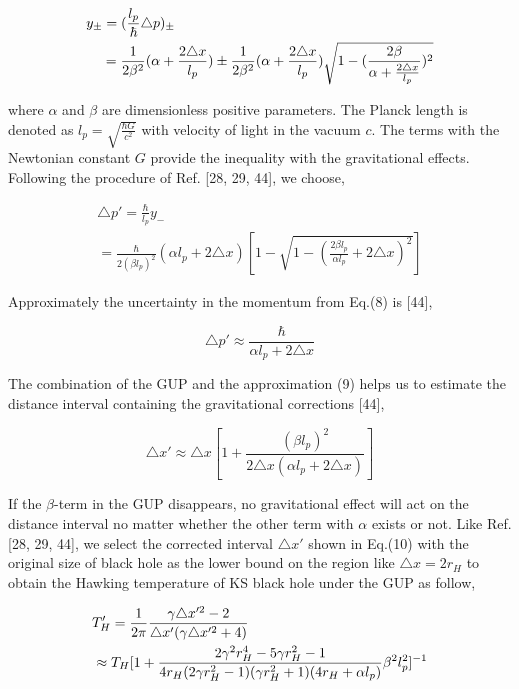 \documentclass[graphicx, 12pt]{article}
\begin{document}
\begin{eqnarray}
y_{\pm}=(\frac{l_{p}}{\hbar}\triangle
p)_{\pm}\hspace{6.5cm}\nonumber\\
=\frac{1}{2\beta^{2}}(\alpha+\frac{2\triangle
x}{l_{p}})\pm\frac{1}{2\beta^{2}}(\alpha+\frac{2\triangle
x}{l_{p}})\sqrt{1-(\frac{2\beta}{\alpha+\frac{2\triangle
x}{l_{p}}})^{2}}
\end{eqnarray}

\noindent where $\alpha$ and $\beta$ are dimensionless positive
parameters. The Planck length is denoted as
$l_{p}=\sqrt{\frac{\hbar G}{c^{2}}}$ with velocity of light in the
vacuum $c$. The terms with the Newtonian constant $G$ provide the
inequality with the gravitational effects. Following the procedure
of Ref. [28, 29, 44], we choose,

\begin{eqnarray}
\triangle p'=\frac{\hbar}{l_{p}}y_{-}\hspace{6cm}\nonumber\\
=\frac{\hbar}{2(\beta l_{p})^{2}}(\alpha l_{p}+2\triangle
x)[1-\sqrt{1-(\frac{2\beta l_{p}}{\alpha l_{p}}+2\triangle
x)^{2}}]
\end{eqnarray}

\noindent Approximately the uncertainty in the momentum from
Eq.(8) is [44],

\begin{equation}
\triangle p'\approx\frac{\hbar}{\alpha l_{p}+2\triangle x}
\end{equation}

\noindent The combination of the GUP and the approximation (9)
helps us to estimate the distance interval containing the
gravitational corrections [44],

\begin{equation}
\triangle x'\approx\triangle x[1+\frac{(\beta
l_{p})^{2}}{2\triangle x(\alpha l_{p}+2\triangle x)}]
\end{equation}

\noindent If the $\beta$-term in the GUP disappears, no
gravitational effect will act on the distance interval no matter
whether the other term with $\alpha$ exists or not. Like Ref. [28,
29, 44], we select the corrected interval $\triangle x'$ shown in
Eq.(10) with the original size of black hole as the lower bound on
the region like $\triangle x=2r_{H}$ to obtain the Hawking
temperature of KS black hole under the GUP as follow,

\begin{eqnarray}
T'_{H}=\frac{1}{2\pi}\frac{\gamma\triangle x'^{2}-2}{\triangle
x'(\gamma\triangle x'^{2}+4)}\hspace{4.5cm}\nonumber\\
\approx T_{H}[1+\frac{2\gamma^{2}r_{H}^{4}-5\gamma
r_{H}^{2}-1}{4r_{H}(2\gamma r_{H}^{2}-1)(\gamma
r_{H}^{2}+1)(4r_{H}+\alpha l_{p})}\beta^{2}l_{p}^{2}]^{-1}
\end{eqnarray}
\end{document}
